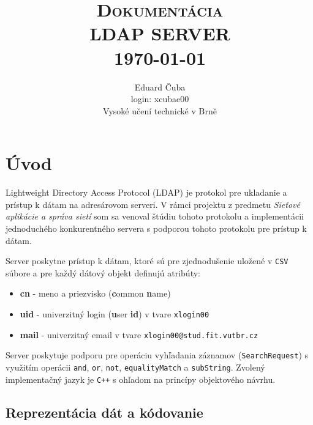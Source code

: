 \documentclass[12pt]{report}
\begin{document}
\title{ \normalsize \large \textsc{Dokumentácia}
        \\ [1.0cm]
        \LARGE \textbf{\uppercase{LDAP server}} \\
        [0.5cm]
        \normalsize \today \vspace*{5\baselineskip}}

\date{}

\author{
        Eduard Čuba \\
        login: xcubae00 \\
        Vysoké učení technické v Brně}

\maketitle
\tableofcontents

\chapter{Úvod}

Lightweight Directory Access Protocol (LDAP) je protokol pre ukladanie a
prístup k dátam na adresárovom serveri.
V rámci projektu z predmetu \emph{Sieťové aplikácie a správa sietí} som sa
venoval štúdiu tohoto protokolu a implementácii jednoduchého konkurentného
servera s podporou tohoto protokolu pre prístup k dátam.

Server poskytne prístup k dátam, ktoré sú pre zjednodušenie uložené v \texttt{CSV} súbore a
pre každý dátový objekt definujú atribúty:
\begin{itemize}
    \item \textbf{cn} - meno a priezvisko (\textbf{c}ommon \textbf{n}ame)
    \item \textbf{uid} - univerzitný login (\textbf{u}ser \textbf{id}) v tvare \texttt{xlogin00}
    \item \textbf{mail} - univerzitný email v tvare \texttt{xlogin00@stud.fit.vutbr.cz}
\end{itemize}

Server poskytuje podporu pre operáciu vyhľadania záznamov (\texttt{SearchRequest}) s využitím operácii
\texttt{and}, \texttt{or}, \texttt{not}, \texttt{equalityMatch} a \texttt{subString}.
Zvolený implementačný jazyk je \texttt{C++} s ohľadom na princípy objektového návrhu.

\section{Reprezentácia dát a kódovanie}
\end{document}
